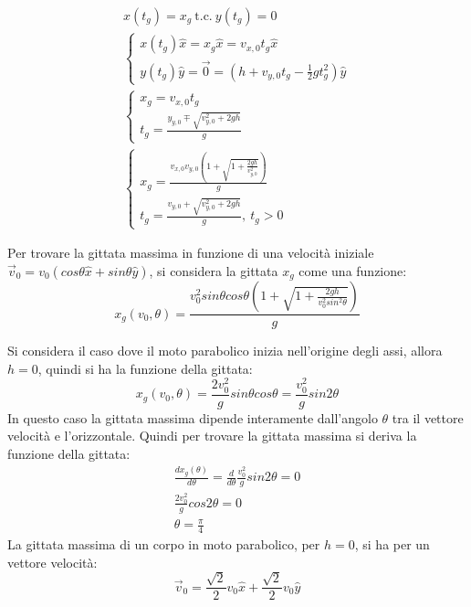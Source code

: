\documentclass{article}
\numberwithin{equation}{subsection}
\begin{document}
\begin{gather}
    x(t_g)=x_g \:\mbox{t.c.}\:y(t_g)=0\\
    \begin{cases}
        x(t_g)\hat{x}=x_g\hat{x}=v_{x,0}t_g\hat{x}\\
        y(t_g)\hat{y}=\vec{0}=\left(h+v_{y,0}t_g-\displaystyle\frac{1}{2}gt_g^{2}\right)\hat{y}
    \end{cases}\\
    \begin{cases}
        x_g=v_{x,0}t_g\\
        t_g=\displaystyle\frac{y_{y,0}\mp\sqrt{v_{y,0}^{2}+2gh}}{g}    
    \end{cases}\\
    \begin{cases}
        x_g=\displaystyle\frac{v_{x,0}v_{y,0}\left(1+\sqrt{1+\displaystyle\frac{2gh}{v_{y,0}^2}}\right)}{g}\\
        t_g=\displaystyle\frac{v_{y,0}+\sqrt{v_{y,0}^{2}+2gh}}{g}{,}\:t_g>0    
    \end{cases}
\end{gather}

Per trovare la gittata massima in funzione di una velocità 
iniziale $\vec{v}_0 = v_0(cos\theta\hat{x}+sin\theta\hat{y})$, 
si considera la gittata $x_g$ come una funzione:
\begin{equation}
    x_g(v_0,\theta)=\displaystyle\frac{v_0^{2}sin\theta cos\theta\left(1+\sqrt{1+\displaystyle\frac{2gh}{v_0^2sin^2\theta}}\right)}{g}
\end{equation}

Si considera il caso dove il moto parabolico inizia nell'origine 
degli assi, allora $h=0$, quindi si ha la funzione della gittata:
\begin{equation}
    x_g(v_0,\theta)=\displaystyle\frac{2v_0^2}{g}sin\theta cos\theta=\frac{v_0^2}{g}sin2\theta
\end{equation}
In questo caso la gittata massima dipende interamente dall'angolo 
$\theta$ tra il vettore velocità e l'orizzontale. Quindi
per trovare la gittata massima si deriva la funzione della gittata: 
\begin{gather}
    \displaystyle\frac{dx_g(\theta)}{d\theta}=\frac{d}{d\theta}\frac{v_0^2}{g}sin2\theta=0\\
    \displaystyle\frac{2v_0^2}{g}cos2\theta=0\\
    \theta=\displaystyle\frac{\pi}{4}
\end{gather}
La gittata massima di un corpo in moto parabolico, per $h=0$, 
si ha per un vettore velocità:\
\begin{equation} 
    \vec{v}_0=\displaystyle\frac{\sqrt{2}}{2}v_0\hat{x}+\frac{\sqrt{2}}{2}v_0\hat{y}
\end{equation}
\end{document}
